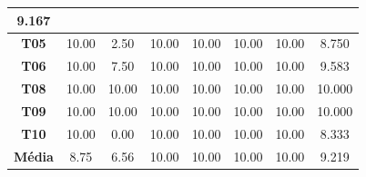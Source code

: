 \begin{table}[htbp]
\begin{tabular}{|c|ccccccc|}
		9.167 \\ \hline
		\rowcolor[HTML]{F2F2F2} 
		\textbf{T05} &
		\multicolumn{1}{c|}{\cellcolor[HTML]{F2F2F2}10.00} &
		\multicolumn{1}{c|}{\cellcolor[HTML]{F2F2F2}2.50} &
		\multicolumn{1}{c|}{\cellcolor[HTML]{F2F2F2}10.00} &
		\multicolumn{1}{c|}{\cellcolor[HTML]{F2F2F2}10.00} &
		\multicolumn{1}{c|}{\cellcolor[HTML]{F2F2F2}10.00} &
		\multicolumn{1}{c|}{\cellcolor[HTML]{F2F2F2}10.00} &
		8.750 \\ \hline
		\textbf{T06} &
		\multicolumn{1}{c|}{\cellcolor[HTML]{FFFFFF}10.00} &
		\multicolumn{1}{c|}{\cellcolor[HTML]{FFFFFF}7.50} &
		\multicolumn{1}{c|}{\cellcolor[HTML]{FFFFFF}10.00} &
		\multicolumn{1}{c|}{\cellcolor[HTML]{FFFFFF}10.00} &
		\multicolumn{1}{c|}{\cellcolor[HTML]{FFFFFF}10.00} &
		\multicolumn{1}{c|}{\cellcolor[HTML]{FFFFFF}10.00} &
		9.583 \\ \hline
		\rowcolor[HTML]{F2F2F2} 
		\textbf{T08} &
		\multicolumn{1}{c|}{\cellcolor[HTML]{F2F2F2}10.00} &
		\multicolumn{1}{c|}{\cellcolor[HTML]{F2F2F2}10.00} &
		\multicolumn{1}{c|}{\cellcolor[HTML]{F2F2F2}10.00} &
		\multicolumn{1}{c|}{\cellcolor[HTML]{F2F2F2}10.00} &
		\multicolumn{1}{c|}{\cellcolor[HTML]{F2F2F2}10.00} &
		\multicolumn{1}{c|}{\cellcolor[HTML]{F2F2F2}10.00} &
		10.000 \\ \hline
		\textbf{T09} &
		\multicolumn{1}{c|}{\cellcolor[HTML]{FFFFFF}10.00} &
		\multicolumn{1}{c|}{\cellcolor[HTML]{FFFFFF}10.00} &
		\multicolumn{1}{c|}{\cellcolor[HTML]{FFFFFF}10.00} &
		\multicolumn{1}{c|}{\cellcolor[HTML]{FFFFFF}10.00} &
		\multicolumn{1}{c|}{\cellcolor[HTML]{FFFFFF}10.00} &
		\multicolumn{1}{c|}{\cellcolor[HTML]{FFFFFF}10.00} &
		10.000 \\ \hline
		\rowcolor[HTML]{F2F2F2} 
		\textbf{T10} &
		\multicolumn{1}{c|}{\cellcolor[HTML]{F2F2F2}10.00} &
		\multicolumn{1}{c|}{\cellcolor[HTML]{F2F2F2}0.00} &
		\multicolumn{1}{c|}{\cellcolor[HTML]{F2F2F2}10.00} &
		\multicolumn{1}{c|}{\cellcolor[HTML]{F2F2F2}10.00} &
		\multicolumn{1}{c|}{\cellcolor[HTML]{F2F2F2}10.00} &
		\multicolumn{1}{c|}{\cellcolor[HTML]{F2F2F2}10.00} &
		8.333 \\ \hline
		\rowcolor[HTML]{D0CECE} 
		\textbf{Média} &
		\multicolumn{1}{c|}{\cellcolor[HTML]{D0CECE}8.75} &
		\multicolumn{1}{c|}{\cellcolor[HTML]{D0CECE}6.56} &
		\multicolumn{1}{c|}{\cellcolor[HTML]{D0CECE}10.00} &
		\multicolumn{1}{c|}{\cellcolor[HTML]{D0CECE}10.00} &
		\multicolumn{1}{c|}{\cellcolor[HTML]{D0CECE}10.00} &
		\multicolumn{1}{c|}{\cellcolor[HTML]{D0CECE}10.00} &
		9.219 \\ \hline
	\end{tabular}
	\label{tab:F3_A3_NP_AVALIACAO}
\end{table}

